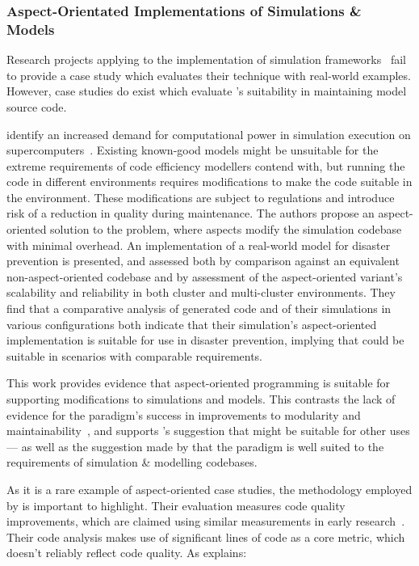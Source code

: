 \subsubsection{Aspect-Orientated Implementations of Simulations \& Models}

Research projects applying \aspectorientation{} to the implementation of
simulation frameworks~\cite{chibani2019using} fail to provide a case study which
evaluates their technique with real-world examples. However, case studies do
exist which evaluate \aspectorientation{}'s suitability in maintaining model
source code.

\citeauthor{ionescu2009aspect} identify an increased demand for computational power in
simulation execution on supercomputers~\cite{ionescu2009aspect}. Existing
known-good models might be unsuitable for the extreme requirements of code
efficiency modellers contend with, but running the code in different
environments requires modifications to make the code suitable in the
environment. These modifications are subject to regulations and introduce risk
of a reduction in quality during maintenance. The authors propose an
aspect-oriented solution to the problem, where aspects modify the simulation
codebase with minimal overhead. An implementation of a real-world model for
disaster prevention is presented, and assessed both by comparison against an
equivalent non-aspect-oriented codebase and by assessment of the aspect-oriented
variant's scalability and reliability in both cluster and multi-cluster
environments. They find that a comparative analysis of generated code and of
their simulations in various configurations both indicate that their
simulation's aspect-oriented implementation is suitable for use in disaster
prevention, implying that \aspectorientation{} could be suitable in scenarios with
comparable requirements.

This work provides evidence that aspect-oriented programming is suitable for
supporting modifications to simulations and models. This contrasts the lack of
evidence for the paradigm's success in improvements to modularity and
maintainability~\cite{przybylek2010wrong,Constantinides04aopconsidered}, and
supports \citet{steimann06paradoxical}'s suggestion that \aspectorientation{}
might be suitable for other uses --- as well as the suggestion made by
\citet{gulyas1999use} that the paradigm is well suited to the requirements of
simulation \& modelling codebases.

As it is a rare example of aspect-oriented case studies, the methodology
employed by \citeauthor{ionescu2009aspect} is important to highlight. Their
evaluation measures code quality improvements, which are claimed using similar
measurements in early \aspectorientation{} research~\cite{kiczales1997aspect}.
Their code analysis makes use of significant lines of code as a core metric,
which doesn't reliably reflect code quality. As \citet{rosenberg1997some}
explains:

